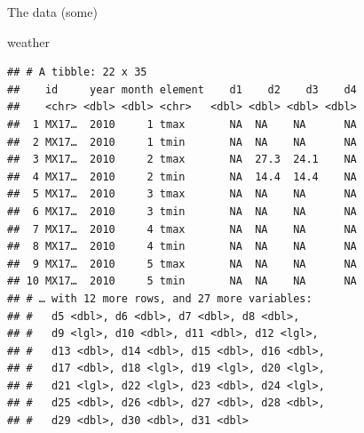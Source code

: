 \documentclass[ignorenonframetext,]{beamer}
\newenvironment{Shaded}{\begin{snugshade}}{\end{snugshade}}
\newcommand{\NormalTok}[1]{#1}
\begin{document}
\begin{frame}[fragile]{The data (some)}
\protect\hypertarget{the-data-some-2}{}

\begin{Shaded}
\begin{Highlighting}[]
\NormalTok{weather}
\end{Highlighting}
\end{Shaded}

\begin{verbatim}
## # A tibble: 22 x 35
##    id     year month element    d1    d2    d3    d4
##    <chr> <dbl> <dbl> <chr>   <dbl> <dbl> <dbl> <dbl>
##  1 MX17…  2010     1 tmax       NA  NA    NA      NA
##  2 MX17…  2010     1 tmin       NA  NA    NA      NA
##  3 MX17…  2010     2 tmax       NA  27.3  24.1    NA
##  4 MX17…  2010     2 tmin       NA  14.4  14.4    NA
##  5 MX17…  2010     3 tmax       NA  NA    NA      NA
##  6 MX17…  2010     3 tmin       NA  NA    NA      NA
##  7 MX17…  2010     4 tmax       NA  NA    NA      NA
##  8 MX17…  2010     4 tmin       NA  NA    NA      NA
##  9 MX17…  2010     5 tmax       NA  NA    NA      NA
## 10 MX17…  2010     5 tmin       NA  NA    NA      NA
## # … with 12 more rows, and 27 more variables:
## #   d5 <dbl>, d6 <dbl>, d7 <dbl>, d8 <dbl>,
## #   d9 <lgl>, d10 <dbl>, d11 <dbl>, d12 <lgl>,
## #   d13 <dbl>, d14 <dbl>, d15 <dbl>, d16 <dbl>,
## #   d17 <dbl>, d18 <lgl>, d19 <lgl>, d20 <lgl>,
## #   d21 <lgl>, d22 <lgl>, d23 <dbl>, d24 <lgl>,
## #   d25 <dbl>, d26 <dbl>, d27 <dbl>, d28 <dbl>,
## #   d29 <dbl>, d30 <dbl>, d31 <dbl>
\end{verbatim}

\end{frame}
\end{document}
